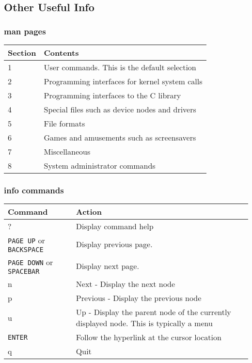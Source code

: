 \documentclass[12pt]{article}
\begin{document}
\subsection{Other Useful Info}%

\subsubsection{man pages}%
\begin{tabular}{|l|l|}
	\hline
	Section & Contents\\ \hline
	1 & User commands. This is the default selection\\
	2 & Programming interfaces for kernel system calls\\
	3 & Programming interfaces to the C library\\
	4 & Special files such as device nodes and drivers\\
	5 & File formats\\
	6 & Games and amusements such as screensavers\\
	7 & Miscellaneous\\
	8 & System administrator commands\\ \hline

\end{tabular}

\vskip 0.15in
\subsubsection{info commands}%
\begin{tabular}{|l|p{3.3in}|}
	\hline
	Command & Action\\ \hline
	? & Display command help\\
	\texttt{PAGE UP} or \texttt{BACKSPACE} & Display previous page.\\
	\texttt{PAGE DOWN} or \texttt{SPACEBAR} & Display next page.\\
	n & Next - Display the next node\\
	p & Previous - Display the previous node\\
	u & Up - Display the parent node of the currently displayed node. This is typically a menu\\
	\texttt{ENTER} & Follow the hyperlink at the cursor location\\
	q & Quit\\ \hline
	

\end{tabular}
\end{document}
